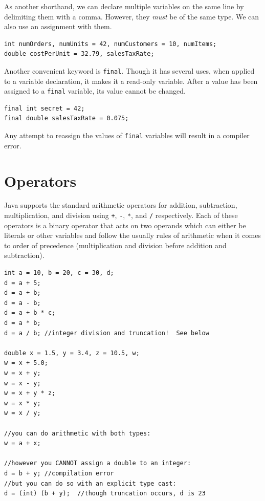 As another shorthand, we can declare multiple variables on the same line by delimiting
them with a comma.  However, they \emph{must} be of the same type.  We can also 
use an assignment with them. 

\begin{verbatim}
int numOrders, numUnits = 42, numCustomers = 10, numItems;
double costPerUnit = 32.79, salesTaxRate;
\end{verbatim}

Another convenient keyword is \texttt{final}.  Though it has several uses, 
when applied to a variable declaration, it makes it a read-only variable.  After a
value has been assigned to a \texttt{final} variable, its value cannot
be changed.  

\begin{verbatim}
final int secret = 42;
final double salesTaxRate = 0.075;
\end{verbatim}

Any attempt to reassign the values of \texttt{final} variables will result
in a compiler error.

\section{Operators}

Java supports the standard arithmetic operators for addition, subtraction, multiplication, and
division using \texttt{+}, \texttt{-}, \texttt{*}, and
\texttt{/} respectively.  Each of these operators is a binary operator that
acts on two operands which can either be literals or other variables and follow
the usually rules of arithmetic when it comes to order of precedence (multiplication 
and division before addition and subtraction).

\begin{verbatim}
int a = 10, b = 20, c = 30, d;
d = a + 5;
d = a + b;
d = a - b;
d = a + b * c;
d = a * b;
d = a / b; //integer division and truncation!  See below

double x = 1.5, y = 3.4, z = 10.5, w;
w = x + 5.0;
w = x + y;
w = x - y;
w = x + y * z;
w = x * y;
w = x / y;

//you can do arithmetic with both types:
w = a + x;

//however you CANNOT assign a double to an integer:
d = b + y; //compilation error
//but you can do so with an explicit type cast:
d = (int) (b + y);  //though truncation occurs, d is 23
\end{verbatim}

